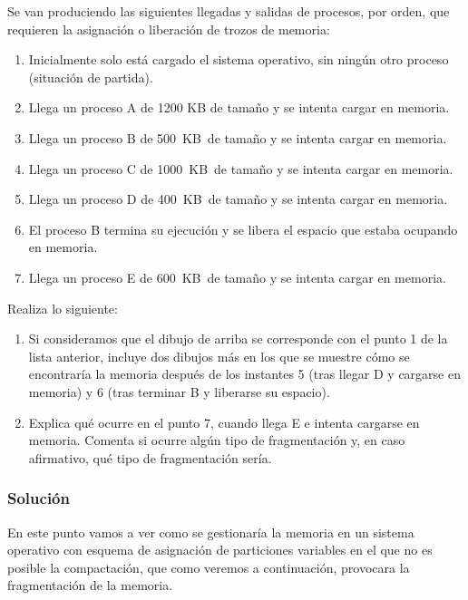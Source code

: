 Se van produciendo las siguientes llegadas y salidas de procesos, por orden, que requieren la asignación o liberación de trozos de memoria:

\begin{enumerate}
    \item Inicialmente solo está cargado el sistema operativo, sin ningún otro proceso (situación de partida).
    \item Llega un proceso A de 1200 KB de tamaño y se intenta cargar en memoria.
    \item Llega un proceso B de 500 KB de tamaño y se intenta cargar en memoria.
    \item Llega un proceso C de 1000 KB de tamaño y se intenta cargar en memoria.
    \item Llega un proceso D de 400 KB de tamaño y se intenta cargar en memoria.
    \item El proceso B termina su ejecución y se libera el espacio que estaba ocupando en memoria.
    \item Llega un proceso E de 600 KB de tamaño y se intenta cargar en memoria.
\end{enumerate}

Realiza lo siguiente:

\begin{enumerate}[label=(\alph*)]
    \item Si consideramos que el dibujo de arriba se corresponde con el punto 1 de la lista anterior, incluye dos dibujos más en los que se muestre cómo se encontraría la memoria después de los instantes 5 (tras llegar D y cargarse en memoria) y 6 (tras terminar B y liberarse su espacio).
    \item Explica qué ocurre en el punto 7, cuando llega E e intenta cargarse en memoria. Comenta si ocurre algún tipo de fragmentación y, en caso afirmativo, qué tipo de fragmentación sería.
\end{enumerate}

\subsubsection{Solución}
En este punto vamos a ver como se gestionaría la memoria en un sistema operativo con esquema de asignación de particiones variables en el que no es posible la compactación, que como veremos a continuación, provocara la fragmentación de la memoria.

